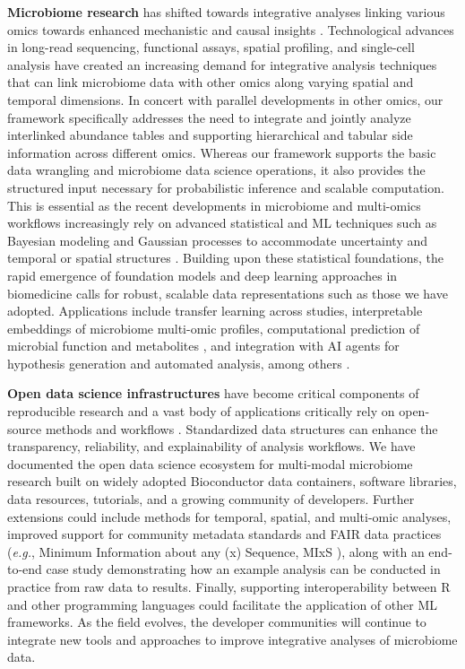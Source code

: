 \documentclass[
  sn-nature,
]{sn-jnl}
\begin{document}
\textbf{Microbiome research} has shifted towards integrative analyses
linking various omics towards enhanced mechanistic and causal insights
\citep{joos2024, bastiaanssen_bugs1_2023}. Technological advances in
long-read sequencing, functional assays, spatial profiling, and
single-cell analysis have created an increasing demand for integrative
analysis techniques that can link microbiome data with other omics along
varying spatial and temporal dimensions. In concert with parallel
developments in other omics, our framework specifically addresses the
need to integrate and jointly analyze interlinked abundance tables and
supporting hierarchical and tabular side information across different
omics. Whereas our framework supports the basic data wrangling and
microbiome data science operations, it also provides the structured
input necessary for probabilistic inference and scalable computation.
This is essential as the recent developments in microbiome and
multi-omics workflows increasingly rely on advanced statistical and ML
techniques such as Bayesian modeling and Gaussian processes to
accommodate uncertainty and temporal or spatial structures
\citep{cheng2019}. Building upon these statistical foundations, the
rapid emergence of foundation models and deep learning approaches in
biomedicine calls for robust, scalable data representations
\citep{awais2025} such as those we have adopted. Applications include
transfer learning across studies, interpretable embeddings of microbiome
multi-omic profiles, computational prediction of microbial function and
metabolites \citep{mallick2019, weiss2016}, and integration with AI
agents for hypothesis generation and automated analysis, among others
\citep{zou2025, gao2024}.

\textbf{Open data science infrastructures} have become critical
components of reproducible research and a vast body of applications
critically rely on open-source methods and workflows
\citep{berg2020, barker2022, hocquet2024}. Standardized data structures
can enhance the transparency, reliability, and explainability of
analysis workflows. We have documented the open data science ecosystem
for multi-modal microbiome research built on widely adopted Bioconductor
data containers, software libraries, data resources, tutorials, and a
growing community of developers. Further extensions could include
methods for temporal, spatial, and multi-omic analyses, improved support
for community metadata standards and FAIR data practices (\emph{e.g.},
Minimum Information about any (x) Sequence, MIxS \citep{field2008}),
along with an end-to-end case study demonstrating how an example
analysis can be conducted in practice from raw data to results. Finally,
supporting interoperability between R and other programming languages
could facilitate the application of other ML frameworks. As the field
evolves, the developer communities will continue to integrate new tools
and approaches to improve integrative analyses of microbiome data.
\end{document}
